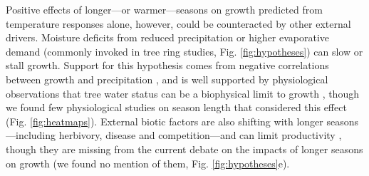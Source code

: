 \documentclass[11pt]{article}
\begin{document}
Positive effects of longer---or warmer---seasons on growth predicted from temperature responses alone, however, could be counteracted by other external drivers. Moisture deficits from reduced precipitation or higher evaporative demand (commonly invoked in tree ring studies, Fig. \ref{fig:hypotheses}) can slow or stall growth. Support for this hypothesis comes from negative correlations between growth and precipitation \citep[or other metrics related to plant access to water in tree ring studies,][]{kolavr2016response,etzold2022number}, and is well supported by physiological observations  that tree water status can be a biophysical limit to growth \citep[i.e., cells cannot expand without sufficient turgor,][]{peters2021turgor,cosgrove2023structure}, though we found few physiological studies on season length that considered this effect (Fig. \ref{fig:heatmaps}). External biotic factors are also shifting with longer seasons---including herbivory, disease and competition\citep{mitton2012mountain,lange2006thresholds,cleland2024effects}---and can limit productivity \citep{sturrock2011climate,la2008forest,senf2017remote}, though they are missing from the current debate on the impacts of longer seasons on growth (we found no mention of them, Fig. \ref{fig:hypotheses}e). 
\end{document}
